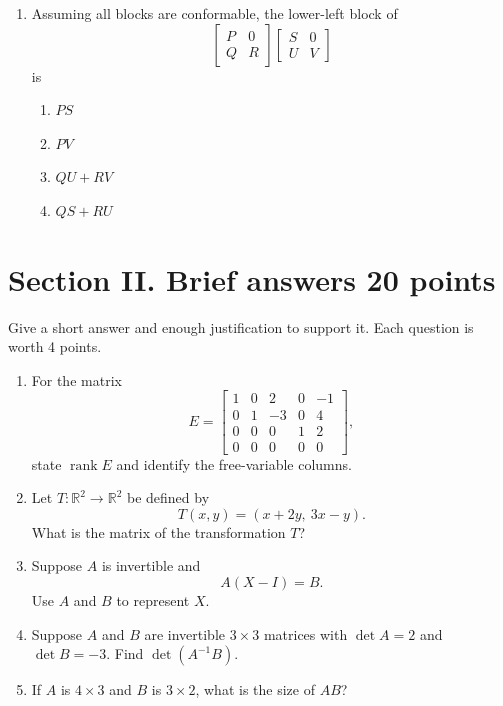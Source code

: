 \documentclass[11pt]{article}
\newif\ifshowsolutions
\newcommand{\R}{\mathbb{R}}
\newcommand{\rank}{\operatorname{rank}}
\newcommand{\answerline}{\ifshowsolutions\else\par\vspace{0.48in}\hrulefill\par\fi}
\newcommand{\mcneedspace}{\ifshowsolutions\Needspace{12\baselineskip}\fi}
\newcommand{\solution}[1]{%
  \ifshowsolutions
    \par\medskip
    {\color{solutionblue}\textbf{Solution.} #1}
    \par\medskip
  \fi}
\begin{document}
\begin{enumerate}
\mcneedspace
\item Assuming all blocks are conformable, the lower-left block of
\[
\begin{bmatrix}P&0\\Q&R\end{bmatrix}
\begin{bmatrix}S&0\\U&V\end{bmatrix}
\]
is
\begin{enumerate}[label=\Alph*.]
  \item $PS$
  \item $PV$
  \item $QU+RV$
  \item $QS+RU$
\end{enumerate}
\solution{\textbf{D.} The lower-left block is obtained from the second block row and first block column.}
\end{enumerate}
\endgroup

\ifshowsolutions\else\newpage\fi
\section*{Section II. Brief answers \hfill 20 points}

Give a short answer and enough justification to support it. Each question is worth 4 points.

\begin{enumerate}
\item For the matrix
\[
E=\begin{bmatrix}
1&0&2&0&-1\\
0&1&-3&0&4\\
0&0&0&1&2\\
0&0&0&0&0
\end{bmatrix},
\]
state $\rank E$ and identify the free-variable columns.
\answerline
\solution{The pivot columns are $1,2,4$, so $\boxed{\rank E=3}$ and the free-variable columns are $\boxed{3\text{ and }5}$.}

\item Let $T:\R^2\to\R^2$ be defined by
\[
T(x,y)=(x+2y,\ 3x-y).
\]
What is the matrix of the transformation $T$?
\answerline
\solution{The columns are $T(1,0)$ and $T(0,1)$, so the standard matrix is $\boxed{\begin{bmatrix}1&2\\3&-1\end{bmatrix}}$.}

\item Suppose $A$ is invertible and
\[
A(X-I)=B.
\]
Use $A$ and $B$ to represent $X$.
\answerline
\solution{Multiply on the left by $A^{-1}$: $X-I=A^{-1}B$. Hence $\boxed{X=I+A^{-1}B}$.}

\item Suppose $A$ and $B$ are invertible $3\times3$ matrices with $\det A=2$ and $\det B=-3$. Find $\det(A^{-1}B)$.
\answerline
\solution{$\det(A^{-1}B)=\det(A^{-1})\det(B)=\frac12(-3)=\boxed{-\frac32}$.}

\item If $A$ is $4\times3$ and $B$ is $3\times2$, what is the size of $AB$?
\answerline
\solution{The inner dimensions agree. The outer dimensions give $\boxed{4\times2}$.}
\end{enumerate}
\end{document}
